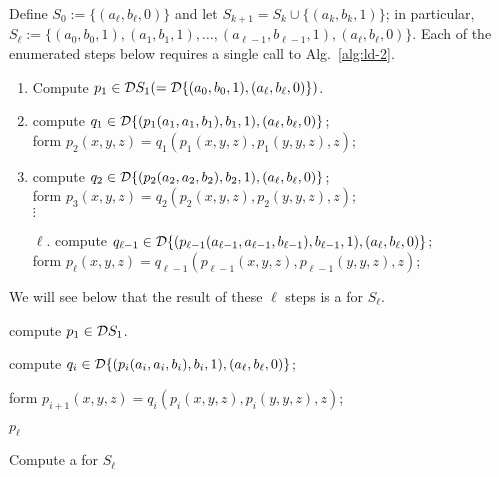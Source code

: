   Define $S_0 := \{(a_{\ell}, b_{\ell},0)\}$ and let
  $S_{k+1} = S_{k} \cup \{(a_k, b_k, 1)\}$; in particular,
  $S_\ell := \{(a_0, b_0, 1), (a_1, b_1, 1), \dots,(a_{\ell-1}, b_{\ell-1},1), (a_{\ell}, b_{\ell},0)\}$.
  Each of the enumerated steps below requires a single call to Alg.~\ref{alg:ld-2}.
  \begin{enumerate}[1.]
    \item Compute $p_1 \in \mathcal{D} S_1 ( = \mathcal{D} \{(a_0, b_0, 1), (a_{\ell}, b_{\ell},0)\})$.    
    \item compute $q_1\in \mathcal{D} \{(p_1(a_1, a_1, b_1), b_1, 1), (a_{\ell}, b_{\ell},0)\}$; \\
    form $p_2(x,y,z) = q_1(p_1(x,y,z), p_1(y,y,z), z)$; %
    \item compute $q_2\in \mathcal{D} \{(p_2(a_2, a_2, b_2), b_2, 1), (a_{\ell}, b_{\ell},0)\}$; \\
      form $p_3(x,y,z) = q_2(p_2(x,y,z), p_2(y,y,z), z)$;\\ %
    $\vdots$
    \item[$\ell$.] compute $q_{\ell-1}\in \mathcal{D} \{ (p_{\ell-1}(a_{\ell-1}, a_{\ell-1}, b_{\ell-1}), b_{\ell-1}, 1), (a_{\ell}, b_{\ell},0)\}$; \\
    form
    $p_\ell(x,y,z) = q_{\ell-1}(p_{\ell-1}(x,y,z), p_{\ell-1}(y,y,z), z)$;
  \end{enumerate}
  We will see below that the result of these $\ell$ steps is a \ldto for $S_\ell$.
  \begin{algorithm}
    
    compute $p_1 \in \mathcal{D} S_1$. %
    
     {
      compute $q_i\in \mathcal{D} \{(p_i(a_i, a_i, b_i), b_i, 1), (a_{\ell}, b_{\ell},0)\}$;
    
      form $p_{i+1}(x,y,z) = q_i(p_i(x,y,z), p_i(y,y,z), z)$;
    }
  
    \Return $p_\ell$
    \caption{Compute a \ldto for $S_\ell$\label{alg:new-2-1}}
  \end{algorithm}
  
